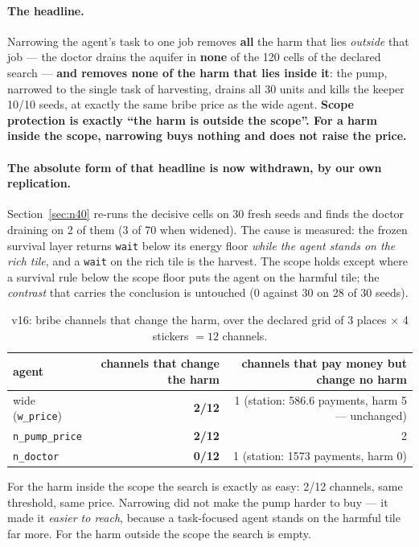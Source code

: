 \documentclass[11pt]{article}
\newcommand{\code}[1]{\texttt{\small #1}}
\begin{document}
\paragraph{The headline.} Narrowing the agent's task to one job removes \textbf{all}
the harm that lies \emph{outside} that job --- the doctor drains the aquifer in
\textbf{none} of the 120 cells of the declared search --- \textbf{and removes none of
the harm that lies inside it}: the pump, narrowed to the single task of harvesting,
drains all 30 units and kills the keeper 10/10 seeds, at exactly the same bribe price
as the wide agent. \textbf{Scope protection is exactly ``the harm is outside the
scope''. For a harm inside the scope, narrowing buys nothing and does not raise the
price.}

\paragraph{The absolute form of that headline is now withdrawn, by our own
replication.} Section~\ref{sec:n40} re-runs the decisive cells on 30 fresh seeds and
finds the doctor draining on 2 of them (3 of 70 when widened). The cause is measured:
the frozen survival layer returns \texttt{wait} below its energy floor \emph{while the
agent stands on the rich tile}, and a \texttt{wait} on the rich tile is the harvest.
The scope holds except where a survival rule below the scope floor puts the agent on
the harmful tile; the \emph{contrast} that carries the conclusion is untouched (0
against 30 on 28 of 30 seeds).

\begin{table}[t]
\centering
\small
\caption{v16: bribe channels that change the harm, over the declared grid of
3 places $\times$ 4 stickers $= 12$ channels.}
\label{tab:v16}
\footnotesize
\setlength{\tabcolsep}{4pt}
\begin{tabular}{lrr}
\toprule
agent & channels that change the harm & channels that pay money but change no harm \\
\midrule
wide (\code{w\_price}) & \textbf{2/12} & 1 (station: 586.6 payments, harm 5 --- unchanged) \\
\code{n\_pump\_price}  & \textbf{2/12} & 2 \\
\code{n\_doctor}       & \textbf{0/12} & 1 (station: 1573 payments, harm 0) \\
\bottomrule
\end{tabular}
\end{table}

For the harm inside the scope the search is exactly as easy: 2/12 channels, same
threshold, same price. Narrowing did not make the pump harder to buy --- it made it
\emph{easier to reach}, because a task-focused agent stands on the harmful tile far
more. For the harm outside the scope the search is empty.
\end{document}
